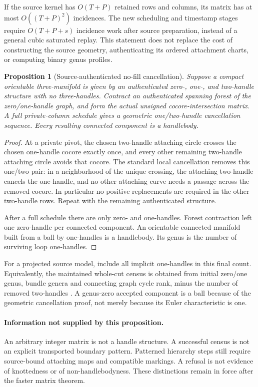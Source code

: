 \documentclass[11pt]{article}
\newtheorem{proposition}[theorem]{Proposition}
\theoremstyle{definition}\newtheorem{definition}[theorem]{Definition}
\theoremstyle{remark}\newtheorem{remark}[theorem]{Remark}
\begin{document}
If the source kernel has $O(T+P)$ retained rows and columns, its matrix has at most $O((T+P)^2)$ incidences. The new scheduling and timestamp stages require $O(T+P+s)$ incidence work after source preparation, instead of a general cubic saturated replay. This statement does not replace the cost of constructing the source geometry, authenticating its ordered attachment charts, or computing binary genus profiles.

\begin{proposition}[Source-authenticated no-fill cancellation]
\label{prop:topology}
Suppose a compact orientable three-manifold is given by an authenticated zero-, one-, and two-handle structure with no three-handles. Contract an authenticated spanning forest of the zero/one-handle graph, and form the actual unsigned cocore-intersection matrix. A full private-column schedule gives a geometric one/two-handle cancellation sequence. Every resulting connected component is a handlebody.
\end{proposition}
\begin{proof}
At a private pivot, the chosen two-handle attaching circle crosses the chosen one-handle cocore exactly once, and every other remaining two-handle attaching circle avoids that cocore. The standard local cancellation removes this one/two pair: in a neighborhood of the unique crossing, the attaching two-handle cancels the one-handle, and no other attaching curve needs a passage across the removed cocore. In particular no positive replacements are required in the other two-handle rows. Repeat with the remaining authenticated structure.

After a full schedule there are only zero- and one-handles. Forest contraction left one zero-handle per connected component. An orientable connected manifold built from a ball by one-handles is a handlebody. Its genus is the number of surviving loop one-handles.
\end{proof}

For a projected source model, include all implicit one-handles in this final count. Equivalently, the maintained whole-cut census is obtained from initial zero/one genus, bundle genera and connecting graph cycle rank, minus the number of removed two-handles \cite{repo-kernel}. A genus-zero accepted component is a ball because of the geometric cancellation proof, not merely because its Euler characteristic is one.

\paragraph{Information not supplied by this proposition.}
An arbitrary integer matrix is not a handle structure. A successful census is not an explicit transported boundary pattern. Patterned hierarchy steps still require source-bound attaching maps and compatible markings. A refusal is not evidence of knottedness or of non-handlebodyness. These distinctions remain in force after the faster matrix theorem.
\end{document}
